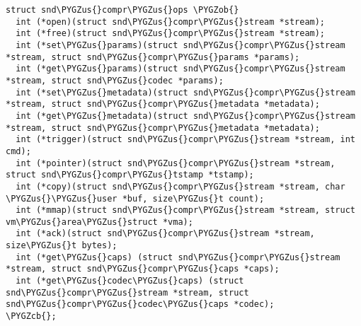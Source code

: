 \documentclass[a4paper,8pt,english]{sphinxmanual}
\def\PYGZus{\char`\_}
\def\PYGZob{\char`\{}
\def\PYGZcb{\char`\}}
\begin{document}
\begin{Verbatim}[commandchars=\\\{\}]
struct snd\PYGZus{}compr\PYGZus{}ops \PYGZob{}
  int (*open)(struct snd\PYGZus{}compr\PYGZus{}stream *stream);
  int (*free)(struct snd\PYGZus{}compr\PYGZus{}stream *stream);
  int (*set\PYGZus{}params)(struct snd\PYGZus{}compr\PYGZus{}stream *stream, struct snd\PYGZus{}compr\PYGZus{}params *params);
  int (*get\PYGZus{}params)(struct snd\PYGZus{}compr\PYGZus{}stream *stream, struct snd\PYGZus{}codec *params);
  int (*set\PYGZus{}metadata)(struct snd\PYGZus{}compr\PYGZus{}stream *stream, struct snd\PYGZus{}compr\PYGZus{}metadata *metadata);
  int (*get\PYGZus{}metadata)(struct snd\PYGZus{}compr\PYGZus{}stream *stream, struct snd\PYGZus{}compr\PYGZus{}metadata *metadata);
  int (*trigger)(struct snd\PYGZus{}compr\PYGZus{}stream *stream, int cmd);
  int (*pointer)(struct snd\PYGZus{}compr\PYGZus{}stream *stream, struct snd\PYGZus{}compr\PYGZus{}tstamp *tstamp);
  int (*copy)(struct snd\PYGZus{}compr\PYGZus{}stream *stream, char \PYGZus{}\PYGZus{}user *buf, size\PYGZus{}t count);
  int (*mmap)(struct snd\PYGZus{}compr\PYGZus{}stream *stream, struct vm\PYGZus{}area\PYGZus{}struct *vma);
  int (*ack)(struct snd\PYGZus{}compr\PYGZus{}stream *stream, size\PYGZus{}t bytes);
  int (*get\PYGZus{}caps) (struct snd\PYGZus{}compr\PYGZus{}stream *stream, struct snd\PYGZus{}compr\PYGZus{}caps *caps);
  int (*get\PYGZus{}codec\PYGZus{}caps) (struct snd\PYGZus{}compr\PYGZus{}stream *stream, struct snd\PYGZus{}compr\PYGZus{}codec\PYGZus{}caps *codec);
\PYGZcb{};
\end{Verbatim}
\end{document}
